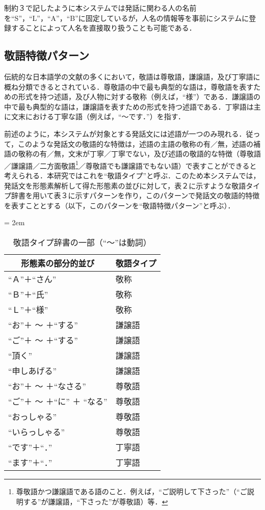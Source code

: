 制約３で記したように本システムでは発話に関わる人の名前を``S''，``L''，``A''，``B''に固定しているが，人名の情報等を事前にシステムに登録することによって人名を直接取り扱うことも可能である．

\subsection{敬語特徴パターン}
伝統的な日本語学の文献の多くにおいて，敬語は尊敬語，謙譲語，及び丁寧語に概ね分類できるとされている．尊敬語の中で最も典型的な語は，尊敬語を表すための形式を持つ述語，及び人物に対する敬称（例えば，``様''）である．謙譲語の中で最も典型的な語は，謙譲語を表すための形式を持つ述語である．丁寧語は主に文末における丁寧な語（例えば，``〜です．\unskip''）を指す．

前述のように，本システムが対象とする発話文には述語が一つのみ現れる．従って，このような発話文の敬語的な特徴は，述語の主語の敬称の有／無，述語の補語の敬称の有／無，文末が丁寧／丁寧でない，及び述語の敬語的な特徴（尊敬語／謙譲語／二方面敬語\footnote{尊敬語かつ謙譲語である語のこと．例えば，``ご説明して下さった''（``ご説明する''が謙譲語，``下さった''が尊敬語）等．}／尊敬語でも謙譲語でもない語）で表すことができると考えられる．本研究ではこれを``敬語タイプ''と呼ぶ．このため本システムでは，発話文を形態素解析して得た形態素の並びに対して，表２に示すような敬語タイプ辞書を用いて表３に示すパターンを作り，このパターンで発話文の敬語的特徴を表すこととする（以下，このパターンを``敬語特徴パターン''と呼ぶ）．


\begin{table}[htbp]
\begin{center} 
\caption{敬語タイプ辞書の一部（``〜''は動詞）} 
\tabcolsep = 2em
\begin{tabular}{ll} 
\hline 
\multicolumn{1}{c}{形態素の部分的並び} & \multicolumn{1}{c}{敬語タイプ} \\ 
\hline
``Ａ''＋``さん''&敬称\\
``Ｂ''＋``氏''&敬称\\
``Ｌ''＋``様''&敬称\\
``お''＋ 〜 ＋``する''&謙譲語\\
``ご''＋ 〜 ＋``する''&謙譲語\\
``頂く''&謙譲語\\
``申しあげる''&謙譲語\\
``お''＋ 〜 ＋``なさる''&尊敬語\\
``ご''＋ 〜 ＋``に'' ＋ ``なる''&尊敬語\\
``おっしゃる''&尊敬語\\
``いらっしゃる''&尊敬語\\
``です''＋``．''&丁寧語\\
``ます''＋``．''&丁寧語\\
\hline 
\end{tabular} 
\end{center} 
\end{table} 


